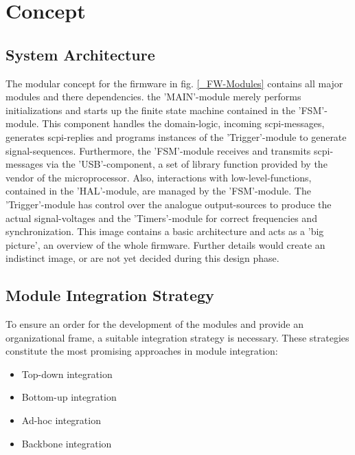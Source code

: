 	\chapter{Concept}
	\label{cha:Concept}
	\section{ System Architecture }
	The modular concept for the firmware in fig. \ref{_FW-Modules} contains all major modules and there dependencies. the 'MAIN'-module merely performs initializations and starts up the finite state machine contained in the 'FSM'-module. This component handles the domain-logic, incoming scpi-messages, generates scpi-replies and programs instances of the 'Trigger'-module to generate signal-sequences. Furthermore, the 'FSM'-module receives and transmits scpi-messages via the 'USB'-component, a set of library function provided by the vendor of the microprocessor. Also, interactions with low-level-functions, contained in the 'HAL'-module, are managed by the 'FSM'-module. The 'Trigger'-module has control over the analogue output-sources to produce the actual signal-voltages and the 'Timers'-module for correct frequencies and synchronization. This image contains a basic architecture and acts as a 'big picture', an overview of the whole firmware. Further details would create an indistinct image, or are not yet decided during this design phase.

	\section{Module Integration Strategy}
		To ensure an order for the development of the modules and provide an organizational frame, a suitable integration strategy is necessary. These strategies constitute the most promising approaches in module integration: \\
		\begin{itemize} \setlength\itemsep{1px}
		\item Top-down integration 
		\item Bottom-up integration 
		\item Ad-hoc integration 
		\item Backbone integration \\
		\end{itemize} 

